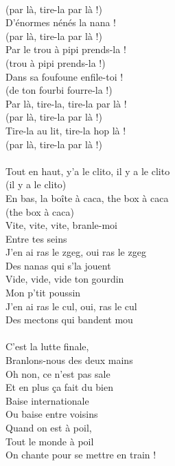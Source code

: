 \\(par là, tire-la par là !)
\\D'énormes nénés la nana !
\\(par là, tire-la par là !)
\\Par le trou à pipi prends-la !
\\(trou à pipi prends-la !)
\\Dans sa foufoune enfile-toi !
\\(de ton fourbi fourre-la !)
\\Par là, tire-la, tire-la par là !
\\(par là, tire-la par là !)
\\Tire-la au lit, tire-la hop là !
\\(par là, tire-la par là !)
\\\\Tout en haut, y'a le clito, il y a le clito
\\(il y a le clito)
\\En bas, la boîte à caca, the box à caca
\\(the box à caca)
\\Vite, vite, vite, branle-moi
\\Entre tes seins
\\J'en ai ras le zgeg, oui ras le zgeg
\\Des nanas qui s'la jouent
\\Vide, vide, vide ton gourdin
\\Mon p'tit poussin
\\J'en ai ras le cul, oui, ras le cul
\\Des mectons qui bandent mou
\\\\C'est la lutte finale,
\\Branlons-nous des deux mains
\\Oh non, ce n'est pas sale
\\Et en plus ça fait du bien
\\Baise internationale
\\Ou baise entre voisins
\\Quand on est à poil,
\\Tout le monde à poil
\\On chante pour se mettre en train !

\breakpage